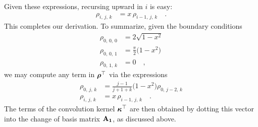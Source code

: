 \documentclass[modern]{aastex631}
\begin{document}
%
Given these expressions, recursing upward in $i$ is easy:
%
\begin{align}
    \rho_{i,\,j,\,k} & = x \, \rho_{i-1,\,j,\,k} \quad.
\end{align}
%
This completes our derivation. 
To summarize, given the boundary conditions
%
\begin{align}
    \rho_{0,\,0,\,0} & = 2 \sqrt{1-x^2} \nonumber                \\
    \rho_{0,\,0,\,1} & = \frac{\pi}{2} \big(1-x^2\big) \nonumber \\
    \rho_{0,\,1,\,k} & = 0 \quad ,
\end{align}
%
we may compute any term in $\boldsymbol{\rho}^\top$ via the expressions
%
\begin{align}
    \label{eq:kT:sTrecurrence}
    \rho_{0,\,j,\,k} & = \frac{j - 1}{j + 1 + k} \big(1 - x^2\big) \rho_{0,\,j-2,\,k} \nonumber \\
    \rho_{i,\,j,\,k} & = x \, \rho_{i-1,\,j,\,k} \quad.
\end{align}
%
The terms of the convolution kernel $\boldsymbol{\kappa}^\top$ are then obtained by dotting this vector into the change of basis matrix ${\mathbf{A_1}}$, as discussed above.
\end{document}
